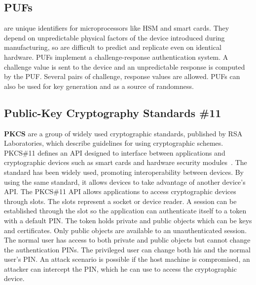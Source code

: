 \subsection{PUFs} are unique identifiers for microprocessors like HSM and smart cards. They depend on unpredictable physical factors of the device introduced during manufacturing, so are difficult to predict and replicate even on identical hardware. PUFs implement a challenge-response authentication system. A challenge value is sent to the device and an unpredictable response is computed by the PUF. Several pairs of challenge, response values are allowed. PUFs can also be used for key generation and as a source of randomness.\label{chap:background:PUF}

\subsection{Public-Key Cryptography Standards \#11}
\textbf{PKCS} are a group of widely used cryptographic standards, published by RSA Laboratories, which describe guidelines for using cryptographic schemes.
PKCS\#11 defines an \ac{API} designed to interface between applications and cryptographic devices such as smart cards and hardware security modules~\cite{pkcs11analysis}. 
The standard has been widely used, promoting interoperability between devices. By using the same standard, it allows devices to take advantage of another device's \ac{API}.
The PKCS\#11 \ac{API} allows applications to access cryptographic devices through slots. The slots represent a socket or device reader. A session can be established through the slot so the application can authenticate itself to a token with a default \ac{PIN}. The token holds private and public objects which can be keys and certificates. Only public objects are available to an unauthenticated session. The normal user has access to both private and public objects but cannot change the authentication \ac{PIN}s. The privileged user can change both his and the normal user's \ac{PIN}.
An attack scenario is possible if the host machine is compromised, an attacker can intercept the \ac{PIN}, which he can use to access the cryptographic device.



